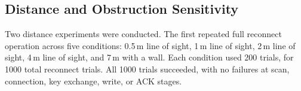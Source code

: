 \documentclass[journal]{IEEEtran}
\begin{document}
\begin{table}[!t]
\renewcommand{\arraystretch}{1.15}
\setlength{\tabcolsep}{3pt}
\caption{Key Exchange Latency (ms, $N=500$)}
\label{tab:key_exchange_latency}
\centering
{}
\end{table}

\subsection{Distance and Obstruction Sensitivity}

Two distance experiments were conducted. The first repeated full reconnect operation across five conditions: 0.5\,m line of sight, 1\,m line of sight, 2\,m line of sight, 4\,m line of sight, and 7\,m with a wall. Each condition used 200 trials, for 1000 total reconnect trials. All 1000 trials succeeded, with no failures at scan, connection, key exchange, write, or ACK stages.
\end{document}
